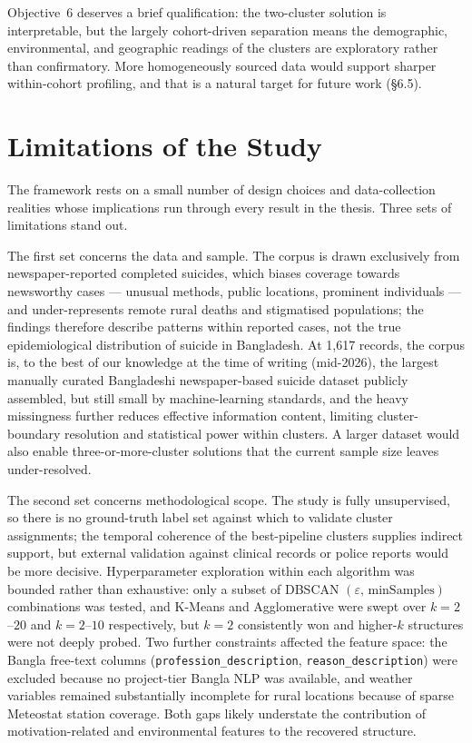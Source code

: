 Objective~6 deserves a brief qualification: the two-cluster solution is interpretable, but the largely cohort-driven separation means the demographic, environmental, and geographic readings of the clusters are exploratory rather than confirmatory. More homogeneously sourced data would support sharper within-cohort profiling, and that is a natural target for future work (\S6.5).

\section{Limitations of the Study}

The framework rests on a small number of design choices and data-collection realities whose implications run through every result in the thesis. Three sets of limitations stand out.

The first set concerns the data and sample. The corpus is drawn exclusively from newspaper-reported completed suicides, which biases coverage towards newsworthy cases --- unusual methods, public locations, prominent individuals --- and under-represents remote rural deaths and stigmatised populations; the findings therefore describe patterns within reported cases, not the true epidemiological distribution of suicide in Bangladesh. At 1,617 records, the corpus is, to the best of our knowledge at the time of writing (mid-2026), the largest manually curated Bangladeshi newspaper-based suicide dataset publicly assembled, but still small by machine-learning standards, and the heavy missingness further reduces effective information content, limiting cluster-boundary resolution and statistical power within clusters. A larger dataset would also enable three-or-more-cluster solutions that the current sample size leaves under-resolved.

The second set concerns methodological scope. The study is fully unsupervised, so there is no ground-truth label set against which to validate cluster assignments; the temporal coherence of the best-pipeline clusters supplies indirect support, but external validation against clinical records or police reports would be more decisive. Hyperparameter exploration within each algorithm was bounded rather than exhaustive: only a subset of DBSCAN $(\varepsilon,\,\text{minSamples})$ combinations was tested, and K-Means and Agglomerative were swept over $k = 2$--$20$ and $k = 2$--$10$ respectively, but $k = 2$ consistently won and higher-$k$ structures were not deeply probed. Two further constraints affected the feature space: the Bangla free-text columns (\texttt{profession\_description}, \texttt{reason\_description}) were excluded because no project-tier Bangla NLP was available, and weather variables remained substantially incomplete for rural locations because of sparse Meteostat station coverage. Both gaps likely understate the contribution of motivation-related and environmental features to the recovered structure.


